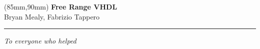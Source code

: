 \documentclass[11pt,a5paper,openright]{book} %
\begin{document}



	\thispagestyle{empty}
	\begin{textblock*}{60mm}(85mm,90mm)
	\noindent
	{\sffamily\LARGE\bfseries Free Range VHDL}\\
	\noindent
	{\sffamily\small Bryan Mealy, Fabrizio Tappero}\\
	{\color{dark-gray}\rule[5pt]{170pt}{3pt}}
	\end{textblock*}
	\null\newpage

	\thispagestyle{empty}
	\null\newpage

	\thispagestyle{empty}
	

	\thispagestyle{empty}
	\null
	\vspace*{\fill}
	\hfill\textit{To everyone who helped}
	\vspace*{\fill}
	\newpage

	\thispagestyle{empty}
	\null\newpage

	\renewcommand\contentsname{Table of Contents} %
	\tableofcontents

	

	\thispagestyle{empty}
	\null\newpage
	\thispagestyle{empty}
	\null\newpage

	\setcounter{page}{1}
	

	
	
	
	
	
	
	
	
	
	
	
	
	
    \begin{appendices}
	    
	    
    \end{appendices}

	\thispagestyle{empty}
	\null\newpage

\end{document}
